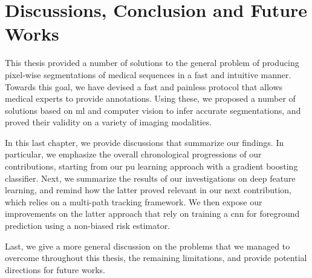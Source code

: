 \chapter{Discussions, Conclusion and Future Works}
\glsresetall

This thesis provided a number of solutions to the general problem of producing pixel-wise segmentations of
medical sequences in a fast and intuitive manner.
Towards this goal, we have devised a fast and painless protocol that allows medical experts to provide annotations.
Using these, we proposed a number of solutions based on \gls{ml} and computer vision to infer accurate segmentations,
and proved their validity on a variety of imaging modalities.

In this last chapter, we provide discussions that summarize our findings.
In particular, we emphasize the overall chronological progressions of our contributions, starting from our \gls{pu} learning approach with a gradient boosting classifier.
Next, we summarize the results of our investigations on deep feature learning, and remind how the latter proved relevant in our next contribution, which relies on a multi-path tracking framework.
We then expose our improvements on the latter approach that rely on training a \gls{cnn} for foreground prediction using a non-biased risk estimator.

Last, we give a more general discussion on the problems that we managed to overcome throughout this thesis, the remaining limitations, and provide potential directions for future works.





